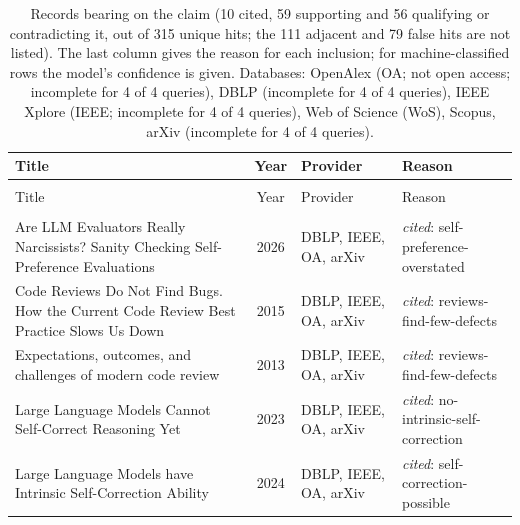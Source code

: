 
\begingroup\footnotesize
\begin{longtable}{@{}%
  >{\raggedright\arraybackslash}p{}c%
  >{\raggedright\arraybackslash}p{}%
  >{\raggedright\arraybackslash}p{}@{}}
\caption{Records bearing on the claim (10 cited, 59 supporting and 56 qualifying or contradicting it, out of 315 unique hits; the 111 adjacent and 79 false hits are not listed). The last column gives the reason for each inclusion; for machine-classified rows the model's confidence is given. Databases: OpenAlex (OA; not open access; incomplete for 4 of 4 queries), DBLP (incomplete for 4 of 4 queries), IEEE Xplore (IEEE; incomplete for 4 of 4 queries), Web of Science (WoS), Scopus, arXiv (incomplete for 4 of 4 queries).}\label{tab:t-fresh-review}\\
\toprule
Title & Year & Provider & Reason \\
\midrule
\endfirsthead
\multicolumn{4}{@{}l}{\emph{\tablename~\thetable{} (cont.)}}\\
\toprule
Title & Year & Provider & Reason \\
\midrule
\endhead
\midrule \multicolumn{4}{r@{}}{\emph{continued on next page}}\\
\endfoot
\bottomrule
\endlastfoot
Are LLM Evaluators Really Narcissists? Sanity Checking Self-Preference Evaluations & 2026 & DBLP, IEEE, OA, arXiv & \emph{cited}: self-preference-overstated \\
Code Reviews Do Not Find Bugs. How the Current Code Review Best Practice Slows Us Down & 2015 & DBLP, IEEE, OA, arXiv & \emph{cited}: reviews-find-few-defects \\
Expectations, outcomes, and challenges of modern code review & 2013 & DBLP, IEEE, OA, arXiv & \emph{cited}: reviews-find-few-defects \\
Large Language Models Cannot Self-Correct Reasoning Yet & 2023 & DBLP, IEEE, OA, arXiv & \emph{cited}: no-intrinsic-self-correction \\
Large Language Models have Intrinsic Self-Correction Ability & 2024 & DBLP, IEEE, OA, arXiv & \emph{cited}: self-correction-possible \\

\end{longtable}
